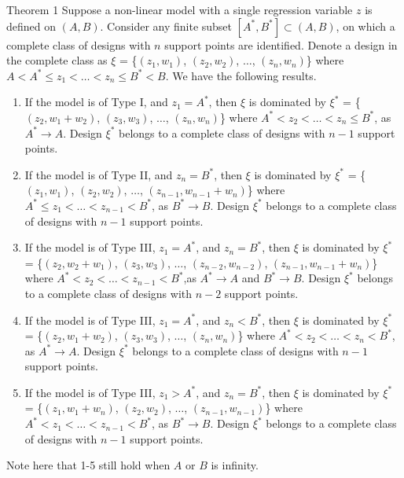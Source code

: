 \documentclass[12pt]{TD-CJS}
\begin{document}
\begin{theorem}{Theorem 1}{}\label{removepts}
 Suppose a non-linear model with a single regression variable $z$ is defined on $(A,B)$. Consider any finite subset $[A^*,B^*]\subset (A,B)$, on which a complete class of designs with $n$ support points are identified. Denote a design in the complete class as  $\xi$ = \{$(z_1,w_1)$, $(z_2,w_2)$, $\ldots$, $(z_n,w_n)$\} where $A<A^*\le z_1< \ldots< z_n \le B^*<B$. We have the following results.\begin{enumerate}[1]
     
     \item If the model is of Type I, and $z_1=A^*$, then $\xi$ is dominated by $\xi^*$ = \{$(z_2,w_1+w_2)$, $(z_3,w_3)$, $\ldots$, $(z_n,w_n)$\} where $A^* < z_2 <\ldots< z_n\le B^*$, as $A^*\to A$.  Design $\xi^*$ belongs to a complete class of designs with $n-1$ support points.
     \item If the model is of Type II, and $z_n=B^*$, then $\xi$ is dominated by $\xi^*$ = \{$(z_1,w_1)$, $(z_2,w_2)$, $\ldots$, $(z_{n-1},w_{n-1}+w_n)$\} where $A^*\le z_1 <\ldots< z_{n-1}< B^*$, as $B^*\to B$.   Design $\xi^*$ belongs to a complete class of designs with $n-1$ support points.
     \item If the model is of Type III, $z_1 = A^*$, and $z_n=B^*$, then $\xi$ is dominated by $\xi^*$ = \{$(z_2,w_2+w_1)$, $(z_3,w_3)$, $\ldots$, $(z_{n-2},w_{n-2})$,  $(z_{n-1},w_{n-1}+w_n)$\} where $A^*< z_2 <\ldots< z_{n-1}< B^*$,as $A^*\to A$ and $B^*\to B$.   Design $\xi^*$ belongs to a complete class of designs with $n-2$ support points.
     \item If the model is of Type III, $z_1 = A^*$, and $z_n<B^*$, then $\xi$ is dominated by $\xi^*$ = \{$(z_2,w_1+w_2)$, $(z_3,w_3)$, $\ldots$, $(z_n,w_n)$\} where $A^* < z_2 <\ldots< z_n< B^*$, as $A^*\to A$.  Design $\xi^*$ belongs to a complete class of designs with $n-1$ support points.
     \item If the model is of Type III, $z_1 > A^*$, and $z_n = B^*$, then $\xi$ is dominated by $\xi^*$ = \{$(z_1,w_1+w_n)$, $(z_2,w_2)$, $\ldots$, $(z_{n-1},w_{n-1})$\} where $A^*< z_1 <\ldots< z_{n-1}< B^*$, as $B^*\to B$. Design $\xi^*$ belongs to a complete class of designs with $n-1$ support points.
     
    
 \end{enumerate}
 Note here that 1-5 still hold when $A$ or $B$ is infinity. 
\end{theorem}
\end{document}
